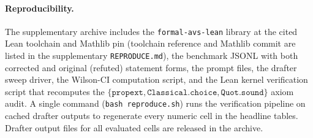 \paragraph{Reproducibility.}
The supplementary archive includes the \texttt{formal-avs-lean}
library at the cited Lean toolchain and Mathlib pin (toolchain
reference and Mathlib commit are listed in the supplementary
\texttt{REPRODUCE.md}), the benchmark JSONL with both corrected
and original (refuted) statement forms, the prompt files, the
drafter sweep driver, the Wilson-CI computation script, and the
Lean kernel verification script that recomputes the
$\{\texttt{propext}, \texttt{Classical.choice}, \texttt{Quot.sound}\}$
axiom audit. A single command (\texttt{bash reproduce.sh}) runs
the verification pipeline on cached drafter outputs to
regenerate every numeric cell in the headline tables. Drafter
output files for all evaluated cells are released in the
archive.
